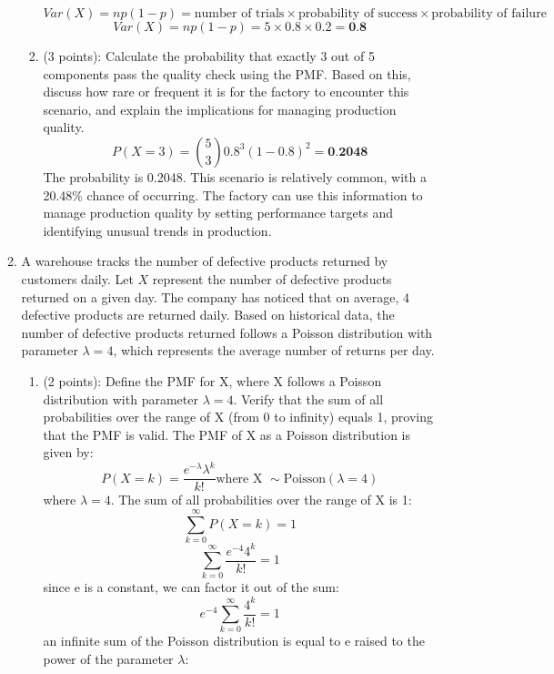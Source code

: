 \documentclass[a3paper,12pt]{article} %
\begin{document}
\begin{enumerate}
\begin{enumerate}
\begin{enumerate}
\[                Var(X) = np(1 - p) = \text{number of trials} \times \text{probability of success} \times \text{probability of failure}
            \]
            \[
                Var(X) = np(1 - p) = 5 \times 0.8 \times 0.2 = \textbf{0.8}
            \]
            \item (3 points): Calculate the probability that exactly 3 out of 5 components pass the quality check using the PMF. Based on this, discuss how rare or frequent it is for the factory to 
            encounter this scenario, and explain the implications for managing production quality.
            \[
            P(X = 3) = \binom{5}{3} 0.8^3 (1 - 0.8)^2 = \textbf{0.2048}
            \]
            The probability is 0.2048. This scenario is relatively common, with a 20.48\% chance of occurring. The factory can use this information to manage production quality by setting performance targets and identifying unusual trends in production.
        \end{enumerate}
        \item A warehouse tracks the number of defective products returned by customers daily. Let \(X\) represent the number of defective products returned on a given day. The company has noticed that on average, 4 defective products are returned daily. Based on historical data, the number of defective products returned follows a Poisson distribution with parameter \(\lambda = 4\), which represents the average number of returns per day.
        \begin{enumerate}
            \item (2 points): Define the PMF for X, where X follows a Poisson distribution with parameter \(\lambda = 4\). Verify that the sum of all probabilities over the range of X (from 0 to infinity) equals 1, proving that the PMF is valid. 
            The PMF of X as a Poisson distribution is given by:
            \[
            P(X = k) = \frac{e^{-\lambda} \lambda^k}{k!} \text{where X } \sim \text{Poisson}(\lambda = 4)
            \]
            where \(\lambda = 4\). The sum of all probabilities over the range of X is 1:
            \[
            \sum_{k = 0}^{\infty} P(X = k) =  1
            \]
            \[
            \sum_{k = 0}^{\infty} \frac{e^{-4} 4^k}{k!} = 1
            \]
            since e is a constant, we can factor it out of the sum:
            \[
            e^{-4} \sum_{k = 0}^{\infty} \frac{4^k}{k!} = 1
            \]
            an infinite sum of the Poisson distribution is equal to e raised to the power of the parameter \(\lambda\):
            \[
\]
\end{enumerate}
\end{enumerate}
\end{enumerate}
\end{document}
